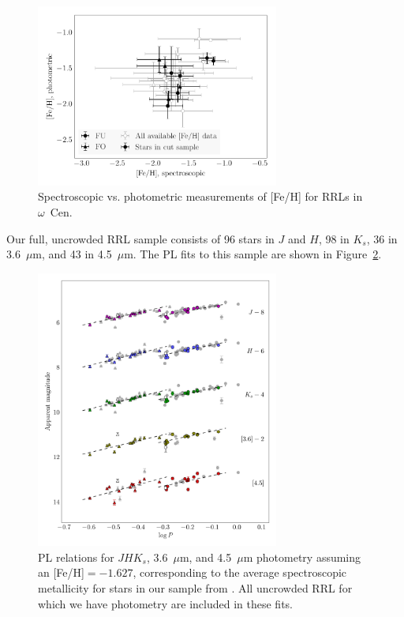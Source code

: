 \documentclass[a4paper,fleqn,usenatbib]{mnras}
\begin{document}
\begin{figure}
\begin{center}
\includegraphics[width=80mm]{reworked_fitting_code/final_plots/metallicity_comparison_all.pdf}
\caption{Spectroscopic vs. photometric measurements of [Fe/H] for RRLs in $\omega$~Cen.}
\label{fig:metallicity_comparison}
\end{center}
\end{figure}



Our full, uncrowded RRL sample consists of 96 stars in $J$ and $H$, 98 in $K_s$, 36 in 3.6~$\mu$m, and 43 in 4.5~$\mu$m. The PL fits to this sample are shown in Figure~\ref{fig:omegaCen_pl_m4}.

\begin{figure}
\begin{center}
\includegraphics[width=80mm]{reworked_fitting_code/final_plots/multiwavelength_PL_m4_clipped.pdf}
\caption{PL relations for $J\!H\!K_s$, 3.6~$\mu$m, and 4.5~$\mu$m photometry assuming an [Fe/H]$=-1.627$, corresponding to the average spectroscopic metallicity for stars in our sample from \citep{2006ApJ...640L..43S}. All uncrowded RRL for which we have photometry are included in these fits.}
\label{fig:omegaCen_pl_m4}
\end{center}
\end{figure}
\end{document}
